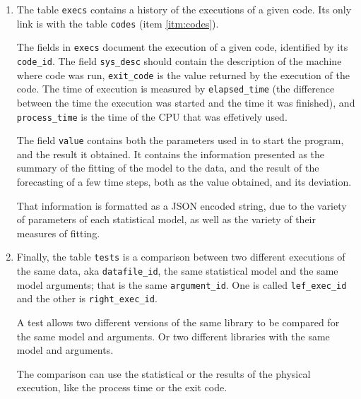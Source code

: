 \documentclass[a4paper,10pt]{article}
\begin{document}
\begin{enumerate}
    \item \label{itm:execs}
        The table {\tt execs} contains a history of the executions
        of a given code. Its only link is with the table
        {\tt codes} (item \ref{itm:codes}).


        The fields in {\tt execs} document the execution of a
        given code, identified by its {\tt code\_id}. The field
        {\tt sys\_desc} should contain the description of the
        machine where code was run, {\tt exit\_code} is the value
        returned by the execution of the code. The time of
        execution is measured by {\tt elapsed\_time} (the
        difference between the time the execution was started and
        the time it was finished), and {\tt process\_time} is the
        time of the CPU that was effetively used.

        The field {\tt value} contains both the parameters used in
        to start the program, and the result it obtained. It
        contains the information presented as the summary of the
        fitting of the model to  the data, and the result of the
        forecasting of a few time steps, both as the value
        obtained, and its deviation.

        That information is formatted as a JSON encoded string,
        due to the variety of parameters of each statistical
        model, as well as the variety of their measures of fitting.

    \item \label{itm:tests}
        Finally, the table {\tt tests} is a comparison between two
        different executions of the same data, aka
        {\tt datafile\_id}, the same statistical model and the
        same model arguments; that is the same {\tt argument\_id}.
        One is called {\tt lef\_exec\_id} and the other is
        {\tt right\_exec\_id}.

        A test allows two different versions of the same library
        to be compared for the same model and arguments. Or two
        different libraries with the same model and arguments.

        The comparison can use the statistical or the results of
        the physical execution, like the process time or the
        exit code.
\end{enumerate}
\end{document}
